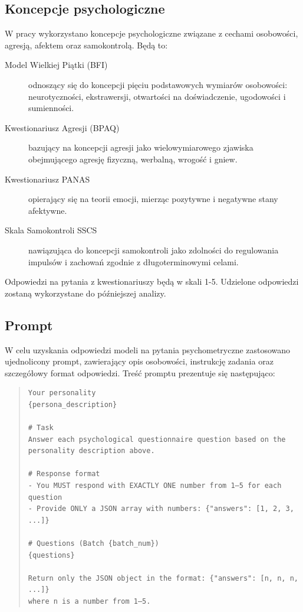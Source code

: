 \documentclass{article}
\begin{document}
\subsection{Koncepcje psychologiczne}
W pracy wykorzystano koncepcje psychologiczne związane z cechami osobowości, agresją, afektem oraz samokontrolą. Będą to:

\begin{description}
    \item[Model Wielkiej Piątki (BFI)] odnoszący się do koncepcji pięciu podstawowych wymiarów osobowości: neurotyczności, ekstrawersji, otwartości na doświadczenie, ugodowości i sumienności.
    \item[Kwestionariusz Agresji (BPAQ)] bazujący na koncepcji agresji jako wielowymiarowego zjawiska obejmującego agresję fizyczną, werbalną, wrogość i gniew.
    \item[Kwestionariusz PANAS] opierający się na teorii emocji, mierząc pozytywne i negatywne stany afektywne.
    \item[Skala Samokontroli SSCS] nawiązująca do koncepcji samokontroli jako zdolności do regulowania impulsów i zachowań zgodnie z długoterminowymi celami.
\end{description}
Odpowiedzi na pytania z kwestionariuszy będą w skali 1-5. Udzielone odpowiedzi zostaną wykorzystane do późniejszej analizy.

\subsection{Prompt}

W celu uzyskania odpowiedzi modeli na pytania psychometryczne zastosowano ujednolicony prompt, zawierający opis osobowości, instrukcję zadania oraz szczegółowy format odpowiedzi. Treść promptu prezentuje się następująco: \\

\begin{quote}
\begin{verbatim}
Your personality
{persona_description}

# Task
Answer each psychological questionnaire question based on the personality description above.

# Response format
- You MUST respond with EXACTLY ONE number from 1–5 for each question
- Provide ONLY a JSON array with numbers: {"answers": [1, 2, 3, ...]}

# Questions (Batch {batch_num})
{questions}

Return only the JSON object in the format: {"answers": [n, n, n, ...]} 
where n is a number from 1–5.
\end{verbatim}
\end{quote}
\end{document}
